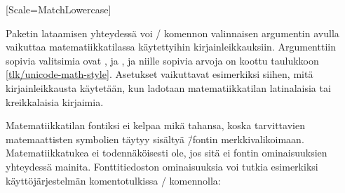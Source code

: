 \begin{koodilohkosis}
\usepackage{fontspec}
\usepackage{unicode-math}
\setmainfont{TeX Gyre Pagella}     %
[Scale=MatchLowercase]
\end{koodilohkosis}


\noindent
Paketin  lataamisen yhteydessä voi
\-/ komennon valinnaisen argumentin avulla vaikuttaa
matematiikkatilassa käytettyihin kirjainleikkauksiin. Argumenttiin
sopivia valitsimia ovat ,  ja
, ja niille sopivia arvoja on koottu taulukkoon
\ref{tlk/unicode-math-style}. Asetukset vaikuttavat esimerkiksi siihen,
mitä kirjainleikkausta käytetään, kun ladotaan matematiikkatilan
latinalaisia tai kreikkalaisia kirjaimia.

\begin{koodilohkosis}
\usepackage[math-style=ISO]{unicode-math}
\end{koodilohkosis}

\noindent
Matematiikkatilan fontiksi ei kelpaa mikä tahansa, koska tarvittavien
matemaattisten symbolien täytyy sisältyä  \=/fontin
merkkivalikoimaan. Matematiikkatukea ei todennäköisesti ole, jos sitä ei
fontin ominaisuuksien yhteydessä mainita. Fonttitiedoston ominaisuuksia
voi tutkia esimerkiksi käyttöjärjestelmän komentotulkissa
\-/ komennolla:


